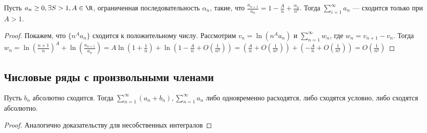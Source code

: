 \begin{theorem}
    Пусть \(a_n \ge 0, \exists S > 1, A \in \R\), ограниченная последовательность \(\alpha_n\), такие, что \(\frac{a_{n + 1}}{a_n} = 1 - \frac{A}{n} + \frac{\alpha_n}{n^s}\). Тогда \(\sum_{i = 1}^\infty a_n\) --- сходится только при \(A > 1\).
\end{theorem}
\begin{proof}
    Покажем, что \(\{n^Aa_n\}\) сходится к положительному числу. Рассмотрим \(v_n = \ln(n^Aa_n)\) и \(\sum_{n = 1}^\infty w_n\), где \(w_n = v_{n + 1} - v_n\). Тогда \(w_n = \ln\left(\frac{n + 1}{n}\right)^A + \ln\left(\frac{a_{n + 1}}{a_n}\right) = A\ln\left(1 + \frac{1}{n}\right) + \ln\left(1 - \frac{A}{n} + O\left(\frac{1}{n^2}\right)\right) = \left(\frac{A}{n} + O\left(\frac{1}{n^2}\right)\right) + \left(-\frac{A}{n} + O\left(\frac{1}{n^2}\right)\right) = O\left(\frac{1}{n^2}\right)\)
\end{proof}

\subsection{Числовые ряды с произвольными членами}
\begin{lemma}
    Пусть \(b_n\) абсолютно сходится. Тогда \(\sum_{n = 1}^\infty(a_n + b_n), \sum_{n = 1}^\infty a_n\) либо одновременно расходятся, либо сходятся условно, либо сходятся абсолютно.
\end{lemma}
\begin{proof}
    Аналогично доказательству для несобственных интегралов
\end{proof}

